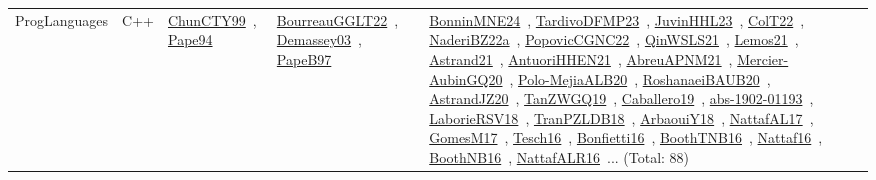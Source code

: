 {\begin{longtable}{lp{3cm}>{\raggedright\arraybackslash}p{6cm}>{\raggedright\arraybackslash}p{6cm}>{\raggedright\arraybackslash}p{8cm}}
\index{C++}\index{ProgLanguages!C++}ProgLanguages & C++ & \href{../works/ChunCTY99.pdf}{ChunCTY99}~\cite{ChunCTY99}, \href{../works/Pape94.pdf}{Pape94}~\cite{Pape94} & \href{../works/BourreauGGLT22.pdf}{BourreauGGLT22}~\cite{BourreauGGLT22}, \href{../works/Demassey03.pdf}{Demassey03}~\cite{Demassey03}, \href{../works/PapeB97.pdf}{PapeB97}~\cite{PapeB97} & \href{../works/BonninMNE24.pdf}{BonninMNE24}~\cite{BonninMNE24}, \href{../works/TardivoDFMP23.pdf}{TardivoDFMP23}~\cite{TardivoDFMP23}, \href{../works/JuvinHHL23.pdf}{JuvinHHL23}~\cite{JuvinHHL23}, \href{../works/ColT22.pdf}{ColT22}~\cite{ColT22}, \href{../works/NaderiBZ22a.pdf}{NaderiBZ22a}~\cite{NaderiBZ22a}, \href{../works/PopovicCGNC22.pdf}{PopovicCGNC22}~\cite{PopovicCGNC22}, \href{../works/QinWSLS21.pdf}{QinWSLS21}~\cite{QinWSLS21}, \href{../works/Lemos21.pdf}{Lemos21}~\cite{Lemos21}, \href{../works/Astrand21.pdf}{Astrand21}~\cite{Astrand21}, \href{../works/AntuoriHHEN21.pdf}{AntuoriHHEN21}~\cite{AntuoriHHEN21}, \href{../works/AbreuAPNM21.pdf}{AbreuAPNM21}~\cite{AbreuAPNM21}, \href{../works/Mercier-AubinGQ20.pdf}{Mercier-AubinGQ20}~\cite{Mercier-AubinGQ20}, \href{../works/Polo-MejiaALB20.pdf}{Polo-MejiaALB20}~\cite{Polo-MejiaALB20}, \href{../works/RoshanaeiBAUB20.pdf}{RoshanaeiBAUB20}~\cite{RoshanaeiBAUB20}, \href{../works/AstrandJZ20.pdf}{AstrandJZ20}~\cite{AstrandJZ20}, \href{../works/TanZWGQ19.pdf}{TanZWGQ19}~\cite{TanZWGQ19}, \href{../works/Caballero19.pdf}{Caballero19}~\cite{Caballero19}, \href{../works/abs-1902-01193.pdf}{abs-1902-01193}~\cite{abs-1902-01193}, \href{../works/LaborieRSV18.pdf}{LaborieRSV18}~\cite{LaborieRSV18}, \href{../works/TranPZLDB18.pdf}{TranPZLDB18}~\cite{TranPZLDB18}, \href{../works/ArbaouiY18.pdf}{ArbaouiY18}~\cite{ArbaouiY18}, \href{../works/NattafAL17.pdf}{NattafAL17}~\cite{NattafAL17}, \href{../works/GomesM17.pdf}{GomesM17}~\cite{GomesM17}, \href{../works/Tesch16.pdf}{Tesch16}~\cite{Tesch16}, \href{../works/Bonfietti16.pdf}{Bonfietti16}~\cite{Bonfietti16}, \href{../works/BoothTNB16.pdf}{BoothTNB16}~\cite{BoothTNB16}, \href{../works/Nattaf16.pdf}{Nattaf16}~\cite{Nattaf16}, \href{../works/BoothNB16.pdf}{BoothNB16}~\cite{BoothNB16}, \href{../works/NattafALR16.pdf}{NattafALR16}~\cite{NattafALR16}... (Total: 88)\\

\end{longtable}}
